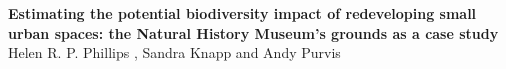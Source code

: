 \documentclass[]{report}
\begin{document}
\textbf{Estimating the potential biodiversity impact of redeveloping small urban spaces: the Natural History Museum's grounds as a case study}
\newline
\\
Helen R. P. Phillips%
, Sandra Knapp and Andy Purvis
\newline
\\
\thispagestyle{empty}


\end{document}

